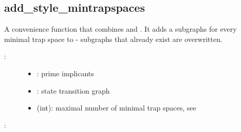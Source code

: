 \documentclass[letterpaper,10pt,english]{sphinxmanual}
\begin{document}
\subsection{add\_style\_mintrapspaces}
\label{\detokenize{StateTransitionGraphs:id22}}\label{\detokenize{StateTransitionGraphs:add-style-mintrapspaces}}

\begin{fulllineitems}
\label{\detokenize{StateTransitionGraphs:PyBoolNet.StateTransitionGraphs.add_style_mintrapspaces}}
A convenience function that combines {\hyperref[\detokenize{StateTransitionGraphs:add-style-subspaces}]{}} and {\hyperref[\detokenize{AspSolver:trap-spaces}]{}}.
It adds a  subgraphs for every minimal trap space to  - subgraphs that already exist are overwritten.
\begin{description}
\item[{:}] \leavevmode\begin{itemize}
\item {} 
: prime implicants

\item {} 
: state transition graph

\item {} 
 (int): maximal number of minimal trap spaces, see 

\end{itemize}

\end{description}

:

\begin{sphinxVerbatim}[commandchars=\\\{\}]
 
\end{sphinxVerbatim}

\end{fulllineitems}
\end{document}
